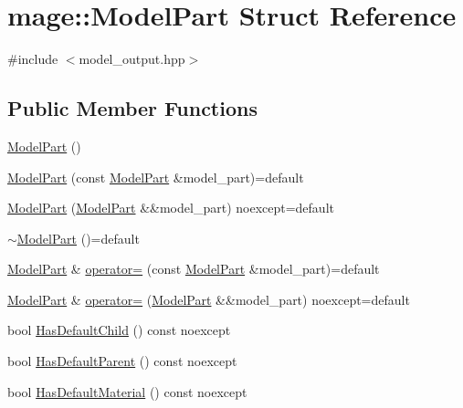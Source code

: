 \hypertarget{structmage_1_1_model_part}{}\section{mage\+:\+:Model\+Part Struct Reference}
\label{structmage_1_1_model_part}


{\ttfamily \#include $<$model\+\_\+output.\+hpp$>$}

\subsection*{Public Member Functions}
\begin{DoxyCompactItemize}
\item 
\hyperlink{structmage_1_1_model_part_a4dd57bba5fcd2af3baaf62fd62536400}{Model\+Part} ()
\item 
\hyperlink{structmage_1_1_model_part_a3c39c2c312f07687f8ad5c2c2580d1e2}{Model\+Part} (const \hyperlink{structmage_1_1_model_part}{Model\+Part} \&model\+\_\+part)=default
\item 
\hyperlink{structmage_1_1_model_part_a7cde529f13e74aac853de739d9f44829}{Model\+Part} (\hyperlink{structmage_1_1_model_part}{Model\+Part} \&\&model\+\_\+part) noexcept=default
\item 
\hyperlink{structmage_1_1_model_part_a3322c5c7924ec30be170ae1ed6dca550}{$\sim$\+Model\+Part} ()=default
\item 
\hyperlink{structmage_1_1_model_part}{Model\+Part} \& \hyperlink{structmage_1_1_model_part_a37e9d66b701ed84111160bf5a003b658}{operator=} (const \hyperlink{structmage_1_1_model_part}{Model\+Part} \&model\+\_\+part)=default
\item 
\hyperlink{structmage_1_1_model_part}{Model\+Part} \& \hyperlink{structmage_1_1_model_part_aba7bba374ab20f6bf55fbb337c166e32}{operator=} (\hyperlink{structmage_1_1_model_part}{Model\+Part} \&\&model\+\_\+part) noexcept=default
\item 
bool \hyperlink{structmage_1_1_model_part_aa12af4ef9373600229b7f46dacec0bca}{Has\+Default\+Child} () const noexcept
\item 
bool \hyperlink{structmage_1_1_model_part_a09e744279e58040b2407db9babda583f}{Has\+Default\+Parent} () const noexcept
\item 
bool \hyperlink{structmage_1_1_model_part_a62e4f54f388430a17d27dc61a4436ed4}{Has\+Default\+Material} () const noexcept
\end{DoxyCompactItemize}
